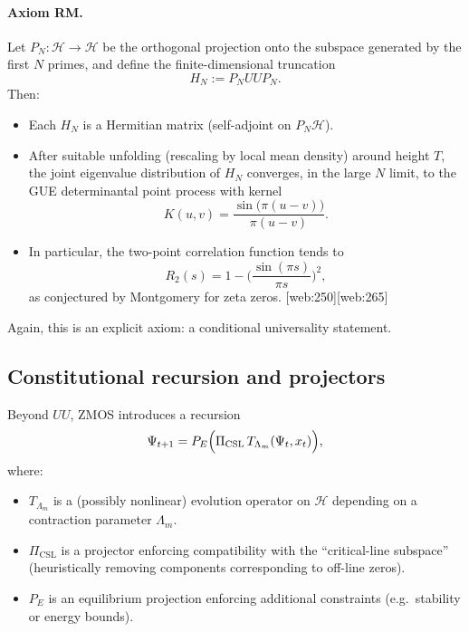 \documentclass[11pt]{article}
\begin{document}
\paragraph{Axiom RM.}
Let $P_N:\mathcal{H}\to \mathcal{H}$ be the orthogonal projection onto the subspace generated by the first $N$ primes, and define the finite-dimensional truncation
\begin{equation}
  H_N := P_N UU P_N.
\end{equation}
Then:
\begin{itemize}
  \item Each $H_N$ is a Hermitian matrix (self-adjoint on $P_N\mathcal{H}$).
  \item After suitable unfolding (rescaling by local mean density) around height $T$, the joint eigenvalue distribution of $H_N$ converges, in the large $N$ limit, to the GUE determinantal point process with kernel
  \begin{equation}
    K(u,v) = \frac{\sin\big(\pi(u-v)\big)}{\pi(u-v)}.
  \end{equation}
  \item In particular, the two-point correlation function tends to
  \begin{equation}
    R_2(s) = 1 - \Big(\frac{\sin(\pi s)}{\pi s}\Big)^2,
  \end{equation}
  as conjectured by Montgomery for zeta zeros. [web:250][web:265]
\end{itemize}

Again, this is an explicit axiom: a conditional universality statement.

\subsection{Constitutional recursion and projectors}

Beyond $UU$, ZMOS introduces a recursion
\begin{equation}
  \Psi_{t+1} = P_E\Bigl( \Pi_{\mathrm{CSL}}\, T_{\Lambda_m}(\Psi_t, x_t)\Bigr),
\end{equation}
where:
\begin{itemize}
  \item $T_{\Lambda_m}$ is a (possibly nonlinear) evolution operator on $\mathcal{H}$ depending on a contraction parameter $\Lambda_m$.
  \item $\Pi_{\mathrm{CSL}}$ is a projector enforcing compatibility with the ``critical-line subspace'' (heuristically removing components corresponding to off-line zeros).
  \item $P_E$ is an equilibrium projection enforcing additional constraints (e.g.\ stability or energy bounds).
\end{itemize}
\end{document}
